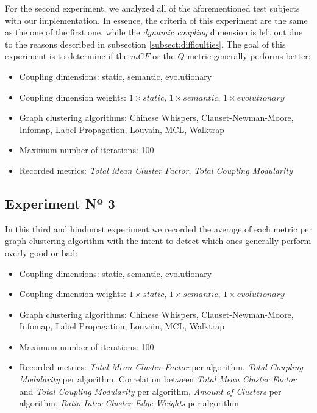 \documentclass[12pt,a4paper]{report}
\begin{document}
For the second experiment, we analyzed all of the
aforementioned test subjects with our implementation. In essence, the criteria
of this experiment are the same as the one of the first one, while the \textit{
dynamic coupling} dimension is left out due to the reasons described in
subsection \ref{subsect:difficulties}. The goal of this experiment is to
determine if the $mCF$ or the $Q$ metric generally performs better:
\begin{itemize}[noitemsep]
    \item Coupling dimensions: static, semantic, evolutionary
    \item Coupling dimension weights: $1 \times static$, $1 \times semantic$, $1 \times evolutionary$
    \item Graph clustering algorithms: Chinese Whispers, Clauset-Newman-Moore, Infomap, Label Propagation, Louvain, MCL, Walktrap
    \item Maximum number of iterations: 100
    \item Recorded metrics:
    \textit{Total Mean Cluster Factor},
    \textit{Total Coupling Modularity}
\end{itemize}


\subsection{Experiment Nº 3}

In this third and hindmost experiment we recorded
the average of each metric per graph clustering algorithm with the intent to
detect which ones generally perform overly good or bad:
\begin{itemize}[noitemsep]
    \item Coupling dimensions: static, semantic, evolutionary
    \item Coupling dimension weights: $1 \times static$, $1 \times semantic$, $1 \times evolutionary$
    \item Graph clustering algorithms: Chinese Whispers, Clauset-Newman-Moore, Infomap, Label Propagation, Louvain, MCL, Walktrap
    \item Maximum number of iterations: 100
    \item Recorded metrics:
    \textit{Total Mean Cluster Factor} per algorithm,
    \textit{Total Coupling Modularity} per algorithm,
    Correlation between \textit{Total Mean Cluster Factor} and \textit{Total Coupling Modularity} per algorithm,
    \textit{Amount of Clusters} per algorithm,
    \textit{Ratio Inter-Cluster Edge Weights} per algorithm
\end{itemize}
\end{document}
